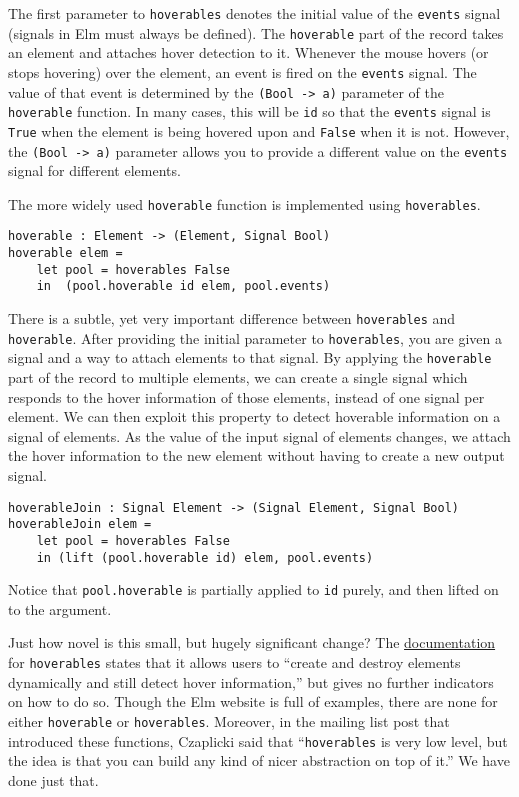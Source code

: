 \documentclass{article}
\begin{document}
The first parameter to
\texttt{hoverables} denotes the initial value of the \texttt{events} signal
(signals in Elm must always be defined).
The \texttt{hoverable} part of the record takes an element and attaches hover
detection to it. Whenever the mouse hovers (or stops hovering) over the
element, an event is fired on the \texttt{events} signal. The value of that
event is determined by the \texttt{(Bool -> a)} parameter of the
\texttt{hoverable} function. In many cases, this will be \texttt{id} so that the
\texttt{events} signal is \texttt{True} when the element is being hovered upon
and \texttt{False} when it is not. However, the \texttt{(Bool -> a)} parameter
allows you to provide a different value on the \texttt{events} signal for different elements.

The more widely used \texttt{hoverable} function is implemented using
\texttt{hoverables}.

\begin{verbatim}
hoverable : Element -> (Element, Signal Bool)
hoverable elem =
    let pool = hoverables False
    in  (pool.hoverable id elem, pool.events)
\end{verbatim}

There is a subtle, yet very important difference between \texttt{hoverables} and
\texttt{hoverable}. After providing the initial parameter to
\texttt{hoverables}, you are given a signal and a way to attach elements to that
signal. By applying the \texttt{hoverable} part of the record to multiple
elements, we can create a single signal which responds to the hover information
of those elements, instead of one signal per element. We can then exploit this
property to detect hoverable information on a signal of elements. As the value
of the input signal of elements changes, we attach the hover information to the
new element without having to create a new output signal.

\begin{verbatim}
hoverableJoin : Signal Element -> (Signal Element, Signal Bool)
hoverableJoin elem =
    let pool = hoverables False
    in (lift (pool.hoverable id) elem, pool.events)
\end{verbatim}

Notice that \texttt{pool.hoverable} is partially applied to \texttt{id}
purely, and then lifted on to the argument. 

Just how novel is this small, but hugely significant change? The
\href{http://docs.elm-lang.org/library/Graphics/Input.elm\#hoverables}{documentation}
for \texttt{hoverables} states that it allows users to ``create and destroy
elements dynamically and still detect hover information,'' but gives no further
indicators on how to do so. Though the Elm website is full of examples, there
are none for either \texttt{hoverable} or \texttt{hoverables}. Moreover, in the
mailing list post that introduced these functions, Czaplicki said that
``\texttt{hoverables} is very low level, but the idea is that you can build any
kind of nicer abstraction on top of it.'' \cite{hover-forum} We have done just
that.
\end{document}

